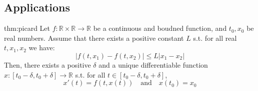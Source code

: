 \documentclass[landscape, 8pt]{extarticle}
\begin{document}
\begin{multicols}{3}
\section{Applications}




\begin{thm}{thm:picard}{}
    Let $f : \mathbb{R} \times \mathbb{R} \to \mathbb{R}$ be a continuous and boudned function, and $t_{0}, x_{0}$ be real numbers. Assume that there exists a positive constant $L$ s.t. for all real $t, x_{1}, x_{2}$ we have:
    \[\lvert f(t, x_{1}) - f(t, x_{2}) \rvert \le L\lvert x_{1} - x_{2} \rvert\]
    Then, there exists a positive $\delta$ and a unique differentiable function $x : [t_{0} - \delta, t_{0} + \delta]\to \mathbb{R}$ s.t. for all $t\in [t_{0}-\delta, t_{0} + \delta]$,
    \[x'(t) = f(t, x(t)) \quad \text{and} \quad x(t_{0}) = x_{0}\]
\end{thm}





\vspace{1000em}
\end{multicols}
\end{document}
